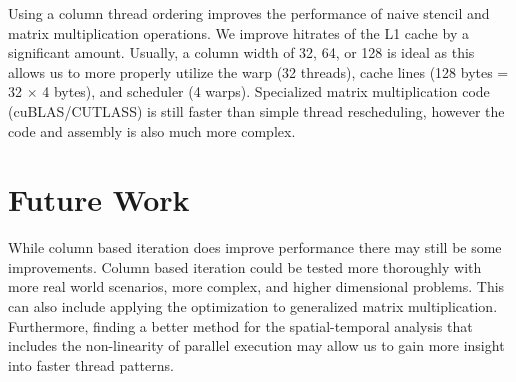 Using a column thread ordering improves the performance of naive stencil and matrix multiplication operations.
We improve hitrates of the L1 cache by a significant amount.
Usually, a column width of 32, 64, or 128 is ideal as this allows us to more properly utilize the warp (32 threads), cache lines (128 bytes = 32 $\times$ 4 bytes), and scheduler (4 warps).
Specialized matrix multiplication code (cuBLAS/CUTLASS) is still faster than simple thread rescheduling, however the code and assembly is also much more complex.

\section{Future Work}
While column based iteration does improve performance there may still be some improvements.
Column based iteration could be tested more thoroughly with more real world scenarios, more complex, and higher dimensional problems.
This can also include applying the optimization to generalized matrix multiplication.
Furthermore, finding a better method for the spatial-temporal analysis that includes the non-linearity of parallel execution may allow us to gain more insight into faster thread patterns.